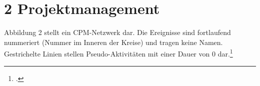 \documentclass{lehramt-informatik-minimal}
\begin{document}
\section{2 Projektmanagement}

Abbildung 2 stellt ein CPM-Netzwerk dar. Die Ereignisse sind fortlaufend
nummeriert (Nummer im Inneren der Kreise) und tragen keine Namen.
Gestrichelte Linien stellen Pseudo-Aktivitäten mit einer Dauer von 0
dar.\footcite[Thema 2 Teilaufgabe 2 Aufgabe 2]{examen:66116:2012:09}

\begin{center}
\end{center}
\end{document}

